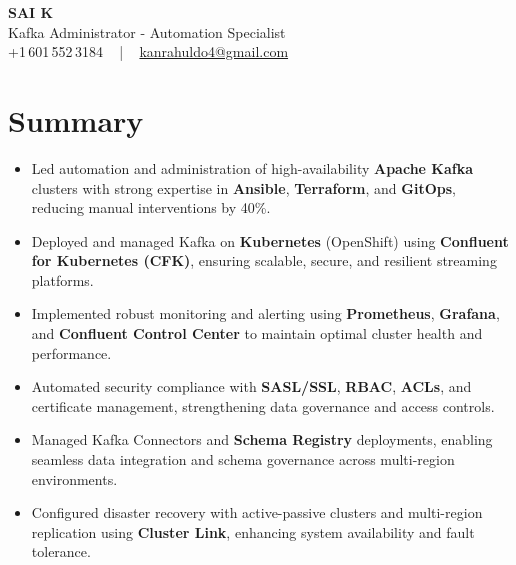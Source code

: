 \documentclass[letterpaper,11pt]{article}
\newcommand{\resumeItem}[1]{
  \item\footnotesize{
    {#1 \vspace{-2pt}}
  }
}
\newcommand{\resumeItemListStart}{\begin{itemize}[leftmargin=*]}
\newcommand{\resumeItemListEnd}{\end{itemize}\vspace{-5pt}}
\begin{document}
\begin{center}
    {\fontsize{14pt}{12pt}\selectfont \textbf{\MakeUppercase{Sai K}}}\\ \vspace{2pt}
    \fontsize{10pt}{12pt}\selectfont Kafka Administrator - Automation Specialist\\ \vspace{2pt}
    \fontsize{10pt}{12pt}\selectfont +1\,601\,552\,3184 ~ | ~
    \href{mailto:kanrahuldo4@gmail.com}{kanrahuldo4@gmail.com}
    \vspace{-10pt}
\end{center}

\section{Summary}
\fontsize{9pt}{10pt}\selectfont
\resumeItemListStart
  \resumeItem{Led automation and administration of high-availability \textbf{Apache Kafka} clusters with strong expertise in \textbf{Ansible}, \textbf{Terraform}, and \textbf{GitOps}, reducing manual interventions by 40\%.}
  \resumeItem{Deployed and managed Kafka on \textbf{Kubernetes} (OpenShift) using \textbf{Confluent for Kubernetes (CFK)}, ensuring scalable, secure, and resilient streaming platforms.}
  \resumeItem{Implemented robust monitoring and alerting using \textbf{Prometheus}, \textbf{Grafana}, and \textbf{Confluent Control Center} to maintain optimal cluster health and performance.}
  \resumeItem{Automated security compliance with \textbf{SASL/SSL}, \textbf{RBAC}, \textbf{ACLs}, and certificate management, strengthening data governance and access controls.}
  \resumeItem{Managed Kafka Connectors and \textbf{Schema Registry} deployments, enabling seamless data integration and schema governance across multi-region environments.}
  \resumeItem{Configured disaster recovery with active-passive clusters and multi-region replication using \textbf{Cluster Link}, enhancing system availability and fault tolerance.}
\resumeItemListEnd
\vspace{-6pt}

\end{document}
